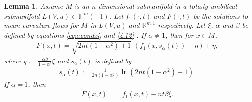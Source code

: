 \documentclass[10pt,a4paper]{amsart}
\newtheorem{lem}{Lemma}
\begin{document}
\begin{lem} \label{F'formula}
Assume $M$  is an $n$-dimensional  submanifold in a totally umbilical submanifold $L(V, u) \subset \mathbb H^{m}(-1)$.
Let $f_1(\cdot,t)$ and $F(\cdot,t)$ be the solutions to  mean curvature flows for $M$ in $L(V,u)$ and  $\mathbb R^{m,1}$ respectively. Let $\xi$, $\alpha$ and $\beta$  be defined by equations \eqref{eqn:condxi} and \eqref{4.12} .
If $\alpha\neq 1$, then for $x\in M$,
	\begin{align}
		F(x,t)=\sqrt{2nt(1-\alpha^2)+1}\, \, (f_1(x,s_{\alpha}(t))-\eta)+\eta,  \label{9.1.5}
	\end{align}
	where $\eta := \frac{\alpha\beta}{1-\alpha^2}\xi$ and  $s_{\alpha}(t)$ is defined by
	\begin{align} \label{eqn:st}
		 	s_{\alpha}(t) :=
		 	\frac{1}{2n(1-\alpha^2)}\ln (2nt(1-\alpha^2)+1).
     \end{align}
If $\alpha=1$, then
\begin{align}
		  	 F(x,t)&=f_1(x,t)-  nt  \beta \xi .  \label{9.1.6}
		  \end{align}
\end{lem}
\end{document}
